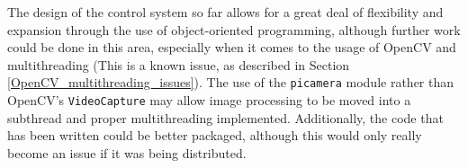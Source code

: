 \documentclass[11pt]{article}
\begin{document}
The design of the control system so far allows for a great deal of flexibility and expansion through the use of object-oriented programming, although further work could be done in this area, especially when it comes to the usage of OpenCV and multithreading (This is a known issue, as described in Section \ref{OpenCV_multithreading_issues}). The use of the \lstinline|picamera| module rather than OpenCV's \lstinline|VideoCapture| may allow image processing to be moved into a subthread and proper multithreading implemented. Additionally, the code that has been written could be better packaged, although this would only really become an issue if it was being distributed.




\newpage
\appendix
\end{document}
